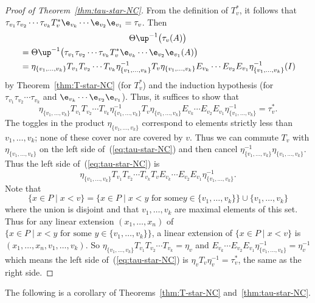\begin{proof}[Proof of Theorem~\ref{thm:tau-star-NC}]
From the definition of $T_v^*$, it follows that $\tau_{v_1}\tau_{v_2}\cdots \tau_{v_k} T_v^* \e_{v_k}\cdots\e_{v_2} \e_{v_1} 
=\tau_v$.
Then
\begin{multline*}
 \Theta\up^{-1}\big(\tau_v(A)\big)\\
\begin{aligned}
 &= 
\Theta\up^{-1}\big(\tau_{v_1}\tau_{v_2}\cdots \tau_{v_k} T_v^* \e_{v_k}\cdots\e_{v_2} \e_{v_1} (A)\big)\\
&=
\eta_{\{v_1,\dots,v_k\}} T_{v_1}T_{v_2}\cdots T_{v_k} \eta_{\{v_1,\dots,v_k\}}^{-1} T_v \eta_{\{v_1,\dots,v_k\}} E_{v_k}\cdots E_{v_2}E_{v_1} \eta_{\{v_1,\dots,v_k\}}^{-1}(I)
\end{aligned}
\end{multline*}
by Theorem~\ref{thm:T-star-NC} (for $T_v^*$) and the induction hypothesis (for $\tau_{v_1}\tau_{v_2}\cdots \tau_{v_k}$ and
$\e_{v_k}\cdots\e_{v_2} \e_{v_1}$). Thus, it suffices to show that
\begin{equation}\label{eq:tau-star-NC}
\eta_{\{v_1,\dots,v_k\}} T_{v_1}T_{v_2}\cdots T_{v_k} \eta_{\{v_1,\dots,v_k\}}^{-1} T_v \eta_{\{v_1,\dots,v_k\}} E_{v_k}\cdots E_{v_2}E_{v_1} \eta_{\{v_1,\dots,v_k\}}^{-1}=\tau_v^*.
\end{equation}
The toggles in the product $\eta_{\{v_1,\dots,v_k\}}$ correspond to elements strictly less than $v_1,\dots,v_k$; none of these cover nor are covered by $v$. Thus
we can commute $T_v$ with $\eta_{\{v_1,\dots,v_k\}}$ on the left side of~(\ref{eq:tau-star-NC}) and then cancel $\eta_{\{v_1,\dots,v_k\}}^{-1} \eta_{\{v_1,\dots,v_k\}}$.
Thus the left side of~(\ref{eq:tau-star-NC}) is
\[
\eta_{\{v_1,\dots,v_k\}} T_{v_1}T_{v_2}\cdots T_{v_k} T_v E_{v_k} \cdots E_{v_2}E_{v_1} \eta_{\{v_1,\dots,v_k\}}^{-1}.
\]
Note that 
\[
\{x\in P \;|\; x<v\}=\{x\in P \;|\; x<y \text{ for some
}y\in\{v_1,\dots,v_k\}\}\cup \{v_1,\dots,v_k\}
\] 
where the union is disjoint and that
$v_1,\dots,v_k$ are maximal elements of this set. Thus for any linear extension
$(x_1,\dots,x_n)$ of $\big\{x\in P \;|\; x<y \text{ for some }y\in\{v_1,\dots,v_k\}\big\}$, a linear extension of 
$\{x\in P \;|\; x<v\}$ is
$(x_1,\dots,x_n,v_1,\dots,v_k)$.
So
$\eta_{\{v_1,\dots,v_k\}} T_{v_1}T_{v_2}\cdots T_{v_k}
=\eta_v$
and
$E_{v_k}\cdots E_{v_2}E_{v_1}\eta_{\{v_1,\dots,v_k\}}^{-1}
=\eta_v^{-1}$
which means the left side of~(\ref{eq:tau-star-NC}) is $\eta_v T_v \eta_v^{-1}= \tau_v^*$,
the same as the right side.
\end{proof}

The following is a corollary of Theorems~\ref{thm:T-star-NC} and~\ref{thm:tau-star-NC}.

